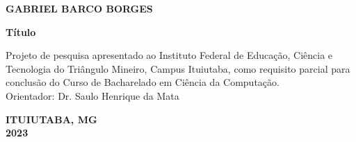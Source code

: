 \newpage
\thispagestyle{empty}

\begin{center}
\textbf{GABRIEL BARCO BORGES}

\vspace*{3 cm}

\textbf{Título}
\end{center}

\vspace*{3 cm}

\hfill
\begin{minipage}{8cm}
Projeto de pesquisa apresentado ao Instituto Federal de Educação, Ciência e Tecnologia do Triângulo Mineiro, Campus Ituiutaba, como requisito parcial para conclusão do Curso de Bacharelado em Ciência da Computação.\\

Orientador: Dr. Saulo Henrique da Mata\\
\end{minipage}

\vspace*{8.5 cm}

\begin{center}
\textbf{ITUIUTABA, MG\\2023}
\end{center}